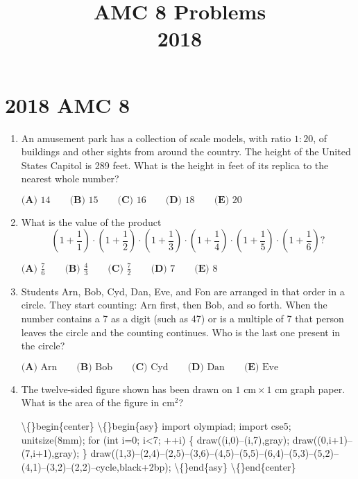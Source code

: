 \documentclass{article}
\title{AMC 8 Problems \\ 2018}
\date{}
\begin{document}
\maketitle\thispagestyle{fancy}\newpage\section*{2018 AMC 8}\begin{enumerate}[label=\arabic*., itemsep=0.5em]\item An amusement park has a collection of scale models, with ratio \(1 : 20\), of buildings and other sights from around the country. The height of the United States Capitol is 289 feet. What is the height in feet of its replica to the nearest whole number?

\(\textbf{(A) }14\qquad\textbf{(B) }15\qquad\textbf{(C) }16\qquad\textbf{(D) }18\qquad\textbf{(E) }20\)\par \vspace{0.5em}\item What is the value of the product
\begin{equation*}
\left(1+\frac{1}{1}\right)\cdot\left(1+\frac{1}{2}\right)\cdot\left(1+\frac{1}{3}\right)\cdot\left(1+\frac{1}{4}\right)\cdot\left(1+\frac{1}{5}\right)\cdot\left(1+\frac{1}{6}\right)?
\end{equation*}


\(\textbf{(A) }\frac{7}{6}\qquad\textbf{(B) }\frac{4}{3}\qquad\textbf{(C) }\frac{7}{2}\qquad\textbf{(D) }7\qquad\textbf{(E) }8\)\par \vspace{0.5em}\item Students Arn, Bob, Cyd, Dan, Eve, and Fon are arranged in that order in a circle. They start counting: Arn first, then Bob, and so forth. When the number contains a 7 as a digit (such as 47) or is a multiple of 7 that person leaves the circle and the counting continues. Who is the last one present in the circle?

\(\textbf{(A) } \text{Arn}\qquad\textbf{(B) }\text{Bob}\qquad\textbf{(C) }\text{Cyd}\qquad\textbf{(D) }\text{Dan}\qquad \textbf{(E) }\text{Eve}\)\par \vspace{0.5em}\item The twelve-sided figure shown has been drawn on \(1 \text{ cm}\times 1 \text{ cm}\) graph paper. What is the area of the figure in \(\text{cm}^2\)?


\textbackslash\{\}begin\{center\}
\textbackslash\{\}begin\{asy\}
import olympiad;
import cse5;
unitsize(8mm);
for (int i=0; i<7; ++i) \{
  draw((i,0)--(i,7),gray);
  draw((0,i+1)--(7,i+1),gray);
\}
draw((1,3)--(2,4)--(2,5)--(3,6)--(4,5)--(5,5)--(6,4)--(5,3)--(5,2)--(4,1)--(3,2)--(2,2)--cycle,black+2bp);
\textbackslash\{\}end\{asy\}
\textbackslash\{\}end\{center\}



\end{enumerate}
\end{document}
